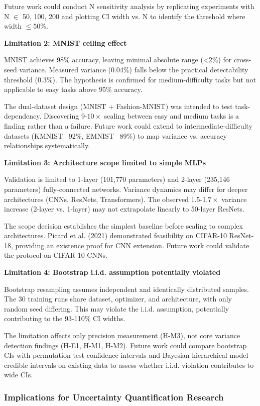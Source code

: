 Future work could conduct N sensitivity analysis by replicating experiments with N $\in$ {50, 100, 200} and plotting CI width vs. N to identify the threshold where width $\leq 50$\%.

\textbf{Limitation 2: MNIST ceiling effect}

MNIST achieves 98\% accuracy, leaving minimal absolute range (<2\%) for cross-seed variance. Measured variance (0.04\%) falls below the practical detectability threshold (0.3\%). The hypothesis is confirmed for medium-difficulty tasks but not applicable to easy tasks above 95\% accuracy.

The dual-dataset design (MNIST + Fashion-MNIST) was intended to test task-dependency. Discovering 9-$10\times$ scaling between easy and medium tasks is a finding rather than a failure. Future work could extend to intermediate-difficulty datasets (KMNIST ~92\%, EMNIST ~89\%) to map variance vs. accuracy relationships systematically.

\textbf{Limitation 3: Architecture scope limited to simple MLPs}

Validation is limited to 1-layer (101,770 parameters) and 2-layer (235,146 parameters) fully-connected networks. Variance dynamics may differ for deeper architectures (CNNs, ResNets, Transformers). The observed 1.5-1.$7\times$ variance increase (2-layer vs. 1-layer) may not extrapolate linearly to 50-layer ResNets.

The scope decision establishes the simplest baseline before scaling to complex architectures. Picard et al. (2021) demonstrated feasibility on CIFAR-10 ResNet-18, providing an existence proof for CNN extension. Future work could validate the protocol on CIFAR-10 CNNs.

\textbf{Limitation 4: Bootstrap i.i.d. assumption potentially violated}

Bootstrap resampling assumes independent and identically distributed samples. The 30 training runs share dataset, optimizer, and architecture, with only random seed differing. This may violate the i.i.d. assumption, potentially contributing to the 93-110\% CI widths.

The limitation affects only precision measurement (H-M3), not core variance detection findings (H-E1, H-M1, H-M2). Future work could compare bootstrap CIs with permutation test confidence intervals and Bayesian hierarchical model credible intervals on existing data to assess whether i.i.d. violation contributes to wide CIs.

\subsubsection{Implications for Uncertainty Quantification Research}

